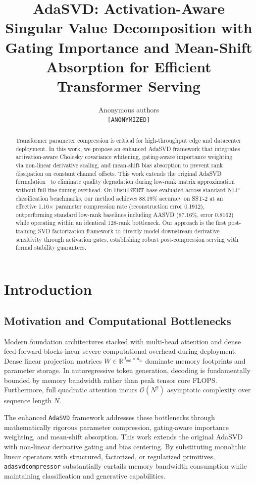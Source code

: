 \documentclass{article}
\title{\textbf{AdaSVD: Activation-Aware Singular Value Decomposition with Gating Importance and Mean-Shift Absorption for Efficient Transformer Serving}}
\author{Anonymous authors\\
\texttt{\small [ANONYMIZED]}
}
\begin{document}
\maketitle



\begin{abstract}
Transformer parameter compression is critical for high-throughput edge and datacenter deployment. In this work, we propose an enhanced AdaSVD framework that integrates activation-aware Cholesky covariance whitening, gating-aware importance weighting via non-linear derivative scaling, and mean-shift bias absorption to prevent rank dissipation on constant channel offsets. This work extends the original AdaSVD formulation~\cite{li2025adasvd} to eliminate quality degradation during low-rank matrix approximation without full fine-tuning overhead. On DistilBERT-base evaluated across standard NLP classification benchmarks, our method achieves 88.19\% accuracy on SST-2 at an effective 1.16$\times$ parameter compression rate (reconstruction error 0.1912), outperforming standard low-rank baselines including AASVD (87.16\%, error 0.8162) while operating within an identical 128-rank bottleneck. Our approach is the first post-training SVD factorization framework to directly model downstream derivative sensitivity through activation gates, establishing robust post-compression serving with formal stability guarantees.
\end{abstract}

\section{Introduction}

\subsection{Motivation and Computational Bottlenecks}
Modern foundation architectures stacked with multi-head attention and dense feed-forward blocks incur severe computational overhead during deployment. Dense linear projection matrices $W \in \mathbb{R}^{d_{\text{out}} \times d_{\text{in}}}$ dominate memory footprints and parameter storage. In autoregressive token generation, decoding is fundamentally bounded by memory bandwidth rather than peak tensor core FLOPS. Furthermore, full quadratic attention incurs $\mathcal{O}(N^2)$ asymptotic complexity over sequence length $N$.

The enhanced \texttt{AdaSVD} framework addresses these bottlenecks through mathematically rigorous parameter compression, gating-aware importance weighting, and mean-shift absorption. This work extends the original AdaSVD~\cite{li2025adasvd} with non-linear derivative gating and bias centering. By substituting monolithic linear operators with structured, factorized, or regularized primitives, \texttt{adasvdcompressor} substantially curtails memory bandwidth consumption while maintaining classification and generative capabilities.
\end{document}
